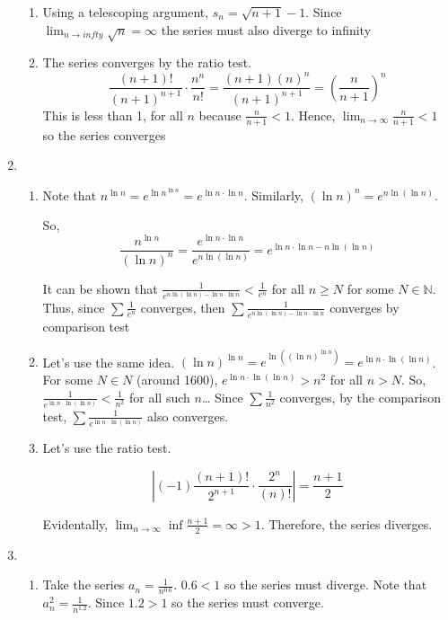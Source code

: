 \documentclass[12pt]{article}
\begin{document}
\begin{enumerate}[start=1,label={\bfseries Problem \arabic*:},leftmargin=1in]
\begin{enumerate}
        \item Using a telescoping argument, $s_{n} = \sqrt{n+1} - 1$. Since $\lim_{n \to infty} \sqrt{n} = \infty$ the series must also diverge to infinity
        \item The series converges by the ratio test. 
        \[
            \frac{(n+1)!}{(n+1)^{n+1}} \cdot \frac{n^{n}}{n!} = \frac{(n+1)(n)^{n}}{(n+1)^{n+1}} = (\frac{n}{n+1})^{n}
        \]
        This is less than 1, for all $n$ because $\frac{n}{n+1} < 1$. Hence, $\lim_{n \to \infty} \frac{n}{n+1} < 1$ so the series converges

    \end{enumerate}
    \item \begin{enumerate}
        \item Note that $n^{\ln n} = e^{\ln n^{\ln n}} = e^{\ln n \cdot \ln n}$. Similarly, $(\ln n)^{n} = e^{n\ln (\ln n)}$. 
        
        So, 
        \[
            \frac{n^{\ln n}}{(\ln n)^{n}} = \frac{e^{\ln n \cdot \ln n}}{e^{n\ln (\ln n)}} = e^{\ln n \cdot \ln n - n\ln (\ln n)}
        \]

        It can be shown that $\frac{1}{e^{n\ln (\ln n)- \ln n \cdot \ln n}} < \frac{1}{e^{n}}$ for all $n \geq N$ for some $N \in \mathbb{N}$. Thus, 
        since $\sum \frac{1}{e^{n}}$ converges, then $\sum \frac{1}{e^{n\ln (\ln n)- \ln n \cdot \ln n}}$ converges by comparison test
        
        \item Let's use the same idea. $(\ln n)^{\ln n} = e^{\ln ((\ln n)^{\ln n})} = e^{\ln n \cdot \ln (\ln n)}$. 
        For some $N \in N$ (around 1600), $e^{\ln n \cdot \ln (\ln n)} > n^{2}$ for all $n > N$. So, $\frac{1}{e^{\ln n \cdot \ln (\ln n)}} < \frac{1}{n^{2}}$ for all such $n$\dots
        Since $\sum \frac{1}{n^{2}}$ converges, by the comparison test, $\sum \frac{1}{e^{\ln n \cdot \ln (\ln n)}}$ also converges. 

        \item Let's use the ratio test.
        
    \[ \left| (-1) \frac{(n+1)!}{2^{n+1}} \cdot \frac{2^{n}}{(n)!} \right| = \frac{n+1}{2} \]

    Evidentally, $\lim_{n \to \infty} \inf \frac{n+1}{2} = \infty > 1$. Therefore, the series diverges. 
    \end{enumerate}

    \item \begin{enumerate}
        \item Take the series $a_{n} = \frac{1}{n^{0.6}}$. $0.6 < 1$ so the series must diverge. 
        Note that $a_{n}^2 = \frac{1}{n^{1.2}}$. Since $1.2 > 1$ so the series must converge. 


\end{enumerate}
\end{enumerate}
\end{document}
